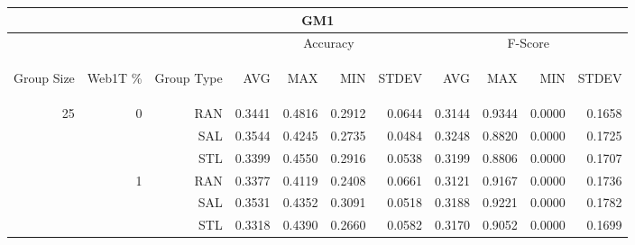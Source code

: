 \begin{center}
\begin{table}[htbp] 
 \begin{center}
\begin{tabular}{ | r | r | r | r | r | r | r | r | r | r | r |}
\hline
\multicolumn{11}{|c|}{GM1}\\
\hline
 & & & \multicolumn{4}{|c|}{Accuracy} & \multicolumn{4}{|c|}{F-Score}\\ \cline{4-11}
\begin{sideways}Group Size\end{sideways} & \begin{sideways}Web1T \%\end{sideways} & \begin{sideways}Group Type\end{sideways} & \begin{sideways}AVG\end{sideways} & \begin{sideways}MAX\end{sideways} & \begin{sideways}MIN\end{sideways} & \begin{sideways}STDEV\end{sideways} & \begin{sideways}AVG\end{sideways} & \begin{sideways}MAX\end{sideways} & \begin{sideways}MIN\end{sideways} & \begin{sideways}STDEV\end{sideways}\\
\hline
\multirow{18}{*}{25}
 & \multirow{3}{*}{0} & RAN & 0.3441 & 0.4816 & 0.2912 & 0.0644 & 0.3144 & 0.9344 & 0.0000 & 0.1658\\ \cline{3-11}
 &   & SAL & 0.3544 & 0.4245 & 0.2735 & 0.0484 & 0.3248 & 0.8820 & 0.0000 & 0.1725\\ \cline{3-11}
 &   & STL & 0.3399 & 0.4550 & 0.2916 & 0.0538 & 0.3199 & 0.8806 & 0.0000 & 0.1707\\ \cline{2-11}
 & \multirow{3}{*}{1} & RAN & 0.3377 & 0.4119 & 0.2408 & 0.0661 & 0.3121 & 0.9167 & 0.0000 & 0.1736\\ \cline{3-11}
 &   & SAL & 0.3531 & 0.4352 & 0.3091 & 0.0518 & 0.3188 & 0.9221 & 0.0000 & 0.1782\\ \cline{3-11}
 &   & STL & 0.3318 & 0.4390 & 0.2660 & 0.0582 & 0.3170 & 0.9052 & 0.0000 & 0.1699\\ \cline{2-11}

\end{tabular}
\end{center}
\end{table}
\end{center}
